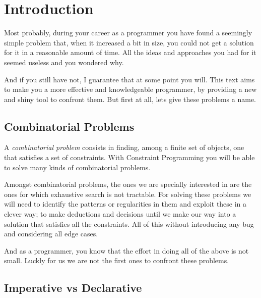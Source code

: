 \section{Introduction}

Most probably, during your career as a programmer you have found
a seemingly simple problem that, when it increased a bit in size, you could not
get a solution for it in a reasonable amount of time. All the ideas and approaches
you had for it seemed useless and you wondered why.

And if you still have not, I guarantee that at some point you will.
This text aims to make you a more effective and knowledgeable programmer,
by providing a new and shiny tool to confront them. But first at all, lets give 
these problems a name.


\subsection{Combinatorial Problems}

A \emph{combinatorial problem} consists in finding, among a finite set of
objects, one that satisfies a set of constraints. With Constraint Programming
you will be able to solve many kinds of combinatorial problems. 

Amongst combinatorial problems, the ones we are specially interested in are the
ones for which exhaustive search is not tractable. For solving these problems
we will need to identify the patterns or regularities in them and exploit these
in a clever way; to make deductions and decisions until we make our way into a
solution that satisfies all the constraints. All of this without introducing any
bug and considering all edge cases.

And as a programmer, you know that the effort in doing all of the above is not
small. Luckly for us we are not the first ones to confront these problems.

\subsection{Imperative vs Declarative}

